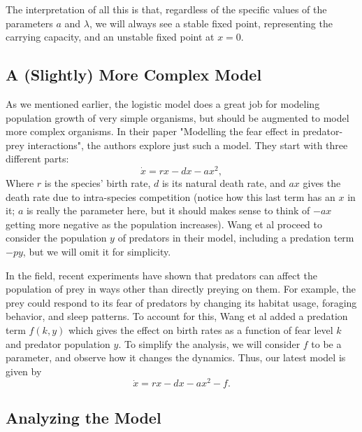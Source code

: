 \documentclass[a5paper]{article}
\theoremstyle{definition}%
\numberwithin{exercise}{section}
\theoremstyle{remark}%
\begin{document}
The interpretation of all this is that, regardless of the specific values of the parameters $a$ and $\lambda$, we will always see a stable fixed point, representing the carrying capacity, and an unstable fixed point at $x=0$. 

\subsection{A (Slightly) More Complex Model}


As we mentioned earlier, the logistic model does a great job for modeling population growth of very simple organisms, but should be augmented to model more complex organisms. In their paper "Modelling the fear effect in predator-prey
interactions", the authors explore just such a model. They start with three different parts:
$$\dot{x}=rx-dx-ax^2,$$
Where $r$ is the species' birth rate, $d$ is its
natural death rate, and $ax$ gives the death rate due to intra-species competition (notice how this last term has an $x$ in it; $a$ is really the parameter here, but it should makes sense to think of $-ax$ getting more negative as the population increases). Wang et al proceed to consider the population $y$ of predators in their model, including a predation term $-py$, but we will omit it for simplicity.

In the field, recent experiments have shown that predators can affect the population of prey in ways other than directly preying on them. For example, the prey could respond to its fear of predators by changing its habitat usage, foraging behavior, and sleep patterns. %
To account for this, Wang et al added a predation term $f(k,y)$ which gives the effect on birth rates as a function of fear level $k$ and predator population $y$. To simplify the analysis, we will consider $f$ to be a parameter, and observe how it changes the dynamics. Thus, our latest model is given by 
$$\dot{x}=rx-dx-ax^2-f.$$

\subsection{Analyzing the Model}

\end{document}
